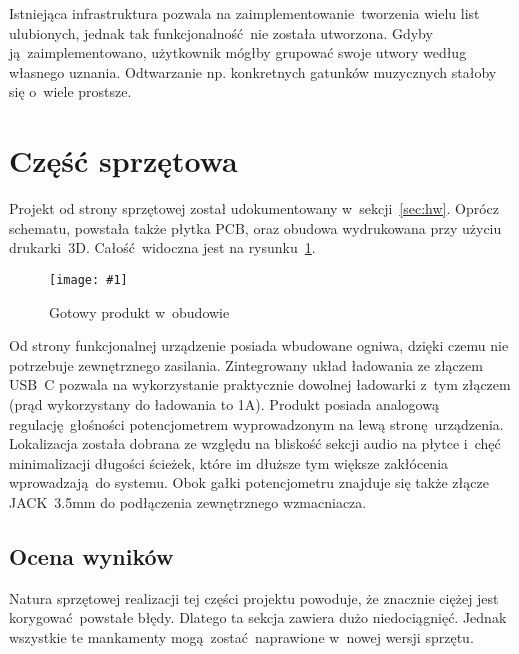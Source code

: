 \documentclass[polish]{aghengthesis}
\newcommand{\imgint}[4]{
	\begin{figure}[{#4}]
		\centering
		\texttt{[image: \#1]}
		\caption{#2}
		\label{#1}
	\end{figure}
}
\newcommand{\imgh}[3]{\imgint{#1}{#2}{#3}{H}}
\begin{document}
			Istniejąca infrastruktura pozwala na zaimplementowanie tworzenia wielu list ulubionych, jednak tak funkcjonalność nie została utworzona. Gdyby ją zaimplementowano, użytkownik mógłby grupować swoje utwory według własnego uznania. Odtwarzanie np. konkretnych gatunków muzycznych stałoby się o~wiele prostsze.
			
	\section{Część sprzętowa}
		Projekt od strony sprzętowej został udokumentowany w~sekcji~\ref{sec:hw}. Oprócz schematu, powstała także płytka PCB, oraz obudowa wydrukowana przy użyciu drukarki~3D. Całość widoczna jest na rysunku~\ref{5/hw_result}.
		
		\imgh{5/hw_result}{Gotowy produkt w~obudowie}{0.7}
		
		Od strony funkcjonalnej urządzenie posiada wbudowane ogniwa, dzięki czemu nie potrzebuje zewnętrznego zasilania. Zintegrowany układ ładowania ze złączem USB~C pozwala na wykorzystanie praktycznie dowolnej ładowarki z~tym złączem (prąd wykorzystany do ładowania to 1A). Produkt posiada analogową regulację głośności potencjometrem wyprowadzonym na lewą stronę urządzenia. Lokalizacja została dobrana ze względu na bliskość sekcji audio na płytce i~chęć minimalizacji długości ścieżek, które im dłuższe tym większe zakłócenia wprowadzają do systemu. Obok gałki potencjometru znajduje się także złącze JACK~3.5mm do podłączenia zewnętrznego wzmacniacza.
		
		\subsection{Ocena wyników}
			Natura sprzętowej realizacji tej części projektu powoduje, że znacznie ciężej jest korygować powstałe błędy. Dlatego ta sekcja zawiera dużo niedociągnięć. Jednak wszystkie te mankamenty mogą zostać naprawione w~nowej wersji sprzętu.
			
\end{document}
